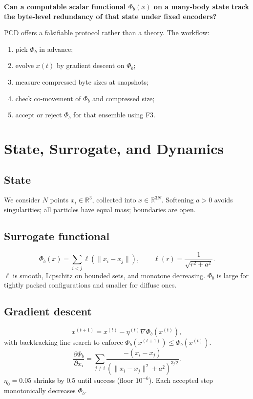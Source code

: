 \documentclass[11pt,a4paper]{article}
\numberwithin{equation}{section}
\newcommand{\R}{\mathbb{R}}
\newcommand{\norm}[1]{\lVert #1\rVert}
\newcommand{\phib}{\Phi_b}
\begin{document}
\textbf{Can a computable scalar functional $\phib(x)$ on a many-body state track the byte-level redundancy of that state under fixed encoders?}

PCD offers a falsifiable protocol rather than a theory.  The workflow:

\begin{enumerate}[label=(\roman*)]
\item pick $\phib$ in advance;
\item evolve $x(t)$ by gradient descent on $\phib$;
\item measure compressed byte sizes at snapshots;
\item check co-movement of $\phib$ and compressed size;
\item accept or reject $\phib$ for that ensemble using F3.
\end{enumerate}

\section{State, Surrogate, and Dynamics}
\subsection{State}
We consider $N$ points $x_i\in\R^3$, collected into $x\in\R^{3N}$.  Softening $a>0$ avoids singularities; all particles have equal mass; boundaries are open.

\subsection{Surrogate functional}
\begin{equation}
\label{eq:phib-def}
\phib(x)=\sum_{i<j}\ell(\norm{x_i-x_j}), \qquad \ell(r)=\frac{1}{\sqrt{r^2+a^2}}.
\end{equation}
$\ell$ is smooth, Lipschitz on bounded sets, and monotone decreasing. $\phib$ is large for tightly packed configurations and smaller for diffuse ones.

\subsection{Gradient descent}
\begin{equation}
x^{(t+1)}=x^{(t)}-\eta^{(t)}\nabla\phib(x^{(t)}),
\end{equation}
with backtracking line search to enforce $\phib(x^{(t+1)})\le\phib(x^{(t)})$.
\begin{equation}
\frac{\partial \phib}{\partial x_i}=\sum_{j\neq i}\frac{-(x_i-x_j)}{(\norm{x_i-x_j}^2+a^2)^{3/2}}.
\end{equation}
$\eta_0=0.05$ shrinks by $0.5$ until success (floor $10^{-6}$).  Each accepted step monotonically decreases $\phib$.
\end{document}
